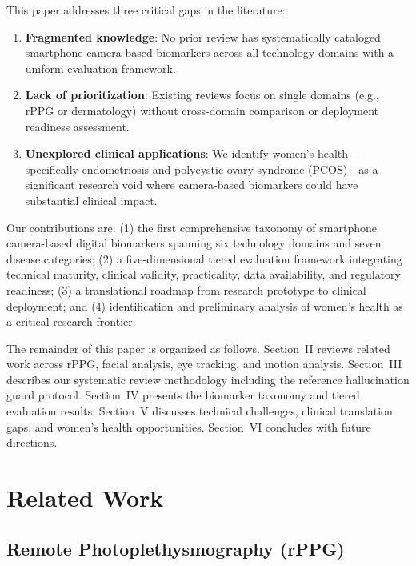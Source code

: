 \documentclass[conference]{IEEEtran}
\begin{document}
This paper addresses three critical gaps in the literature:

\begin{enumerate}
\item \textbf{Fragmented knowledge}: No prior review has systematically cataloged smartphone camera-based biomarkers across all technology domains with a uniform evaluation framework.
\item \textbf{Lack of prioritization}: Existing reviews focus on single domains (e.g., rPPG or dermatology) without cross-domain comparison or deployment readiness assessment.
\item \textbf{Unexplored clinical applications}: We identify women's health---specifically endometriosis and polycystic ovary syndrome (PCOS)---as a significant research void where camera-based biomarkers could have substantial clinical impact.
\end{enumerate}

Our contributions are: (1) the first comprehensive taxonomy of smartphone camera-based digital biomarkers spanning six technology domains and seven disease categories; (2) a five-dimensional tiered evaluation framework integrating technical maturity, clinical validity, practicality, data availability, and regulatory readiness; (3) a translational roadmap from research prototype to clinical deployment; and (4) identification and preliminary analysis of women's health as a critical research frontier.

The remainder of this paper is organized as follows. Section~II reviews related work across rPPG, facial analysis, eye tracking, and motion analysis. Section~III describes our systematic review methodology including the reference hallucination guard protocol. Section~IV presents the biomarker taxonomy and tiered evaluation results. Section~V discusses technical challenges, clinical translation gaps, and women's health opportunities. Section~VI concludes with future directions.

\section{Related Work}

\subsection{Remote Photoplethysmography (rPPG)}
\end{document}
